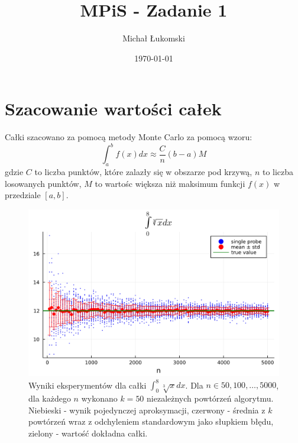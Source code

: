 \documentclass{article}
\title{MPiS - Zadanie 1}
\author{Michał Łukomski}
\date{\today}
\begin{document}
\maketitle

\section{Szacowanie wartości całek}
Całki szacowano za pomocą metody Monte Carlo za pomocą wzoru:
\begin{equation}
    \int_{a}^{b} f(x) dx \approx \frac{C}{n} (b-a) M
\end{equation}
gdzie $C$ to liczba punktów, które zalazły się w obszarze pod krzywą, $n$ to liczba losowanych punktów, $M$ to wartośc większa niż maksimum funkcji $f(x)$ w przedziale $[a,b]$.

\begin{figure}[!h]
    \centering
    \includegraphics[width=\linewidth]{results/z1_1.png}
    \caption{Wyniki eksperymentów dla całki $\int_0^8 \sqrt[3]{x} dx$. Dla $n \in {50, 100, \dots, 5000}$, dla każdego $n$ wykonano $k=50$ niezależnych powtórzeń algorytmu. Niebieski - wynik pojedynczej aproksymacji, czerwony - średnia z $k$ powtórzeń wraz z odchyleniem standardowym jako słupkiem błędu, zielony - wartość dokładna całki.}
\end{figure}
\end{document}
